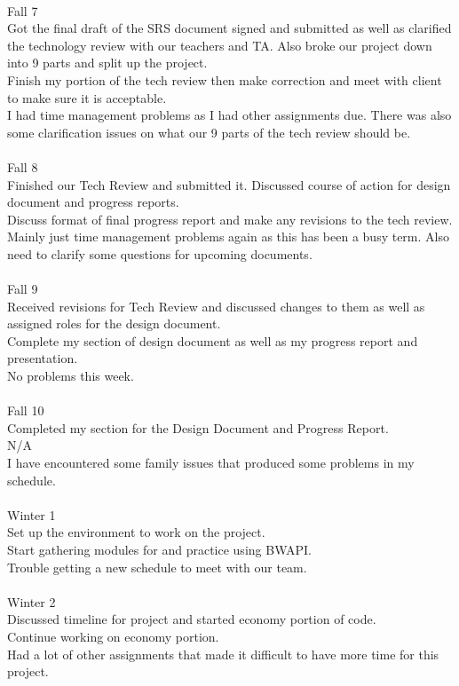 \documentclass[10pt,letterpaper,onecolumn,draftclsnofoot]{IEEEtran}
\begin{document}
\\
Fall 7\\
Got the final draft of the SRS document signed and submitted as well as clarified the technology review with our teachers and TA. Also broke our project down into 9 parts and split up the project.\\ Finish my portion of the tech review then make correction and meet with client to make sure it is acceptable.\\ I had time management problems as I had other assignments due. There was also some clarification issues on what our 9 parts of the tech review should be.\\
\\
Fall 8\\
Finished our Tech Review and submitted it. Discussed course of action for design document and progress reports.\\ Discuss format of final progress report and make any revisions to the tech review.\\ Mainly just time management problems again as this has been a busy term. Also need to clarify some questions for upcoming documents.\\
\\
Fall 9\\
Received revisions for Tech Review and discussed changes to them as well as assigned roles for the design document.\\ Complete my section of design document as well as my progress report and presentation.\\ No problems this week.\\
\\
Fall 10\\
Completed my section for the Design Document and Progress Report.\\ N/A\\ I have encountered some family issues that produced some problems in my schedule.\\
\\
Winter 1\\
Set up the environment to work on the project.\\ Start gathering modules for and practice using BWAPI.\\ Trouble getting a new schedule to meet with our team.\\
\\
Winter 2\\
Discussed timeline for project and started economy portion of code.\\ Continue working on economy portion.\\ Had a lot of other assignments that made it difficult to have more time for this project.\\
\end{document}
